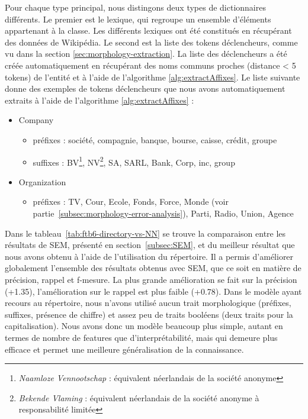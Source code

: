 \documentclass[citation\_needed]{subfiles}
\begin{document}
Pour chaque type principal, nous distingons deux types de dictionnaires différents. Le premier est le lexique, qui regroupe un ensemble d'éléments appartenant à la classe. Les différents lexiques ont été constitués en récupérant des données de Wikipédia. Le second est la liste des tokens déclencheurs, comme vu dans la section \ref{sec:morphology-extraction}. La liste des déclencheurs a été créée automatiquement en récupérant des noms communs proches (distance < 5 tokens) de l'entité et à l'aide de l'algorithme \ref{alg:extractAffixes}. Le liste suivante donne des exemples de tokens déclencheurs que nous avons automatiquement extraits à l'aide de l'algorithme \ref{alg:extractAffixes} :
\begin{itemize}
    \item Company
        \begin{itemize}
            \item préfixes : société, compagnie, banque, bourse, caisse, crédit, groupe
            \item suffixes : BV\footnote{\emph{Naamloze Vennootschap} : équivalent néerlandais de la société anonyme}, NV\footnote{\emph{Bekende Vlaming} : équivalent néerlandais de la société anonyme à responsabilité limitée}, SA, SARL, Bank, Corp, inc, group
        \end{itemize}
    \item Organization
        \begin{itemize}
            \item préfixes : TV, Cour, Ecole, Fonds, Force, Monde (voir partie\ \ref{subsec:morphology-error-analysis}), Parti, Radio, Union, Agence
        \end{itemize}
\end{itemize}

Dans le tableau\ \ref{tab:ftb6-directory-vs-NN} se trouve la comparaison entre les résultats de SEM, présenté en section\ \ref{subsec:SEM}, et du meilleur résultat que nous avons obtenu à l'aide de l'utilisation du répertoire. Il a permis d'améliorer globalement l'ensemble des résultats obtenus avec SEM, que ce soit en matière de précision, rappel et f-mesure. La plus grande amélioration se fait sur la précision (+1.35), l'amélioration sur le rappel est plus faible (+0.78). Dans le modèle ayant recours au répertoire, nous n'avons utilisé aucun trait morphologique (préfixes, suffixes, présence de chiffre) et assez peu de traits booléens (deux traits pour la capitalisation). Nous avons donc un modèle beaucoup plus simple, autant en termes de nombre de features que d'interprétabilité, mais qui demeure plus efficace et permet une meilleure généralisation de la connaissance.
\end{document}
